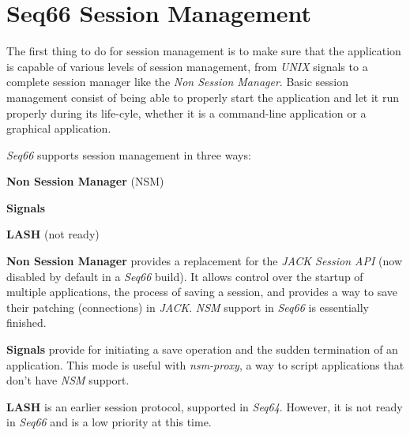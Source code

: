%
%
%

\section{Seq66 Session Management}
\label{sec:sessions}

   The first thing to do for session management is to make sure that the
   application is capable of various levels of session management, from
   \textsl{UNIX} signals to
   a complete session manager like the \textsl{Non Session Manager}.
   Basic session management consist of being able to properly start the
   application and let it run properly during its life-cyle, whether it is a
   command-line application or a graphical application.

   \textsl{Seq66} supports session management in three ways:

   \begin{enumber}
      \item \textbf{Non Session Manager} (NSM)
      \item \textbf{Signals}
      \item \textbf{LASH} (not ready)
   \end{enumber}

   \textbf{Non Session Manager} provides a replacement for the
   \textsl{JACK Session API} (now disabled by default in a \textsl{Seq66}
   build).  It allows control over the startup of multiple applications, the
   process of saving a session, and
   provides a way to save their patching (connections) in \textsl{JACK}.
   \textsl{NSM} support in \textsl{Seq66} is essentially finished.

   \textbf{Signals} provide for initiating a save operation and the sudden
   termination of an application.  This mode is useful with
   \textsl{nsm-proxy}, a way to script applications that don't have \textsl{NSM}
   support.

   \textbf{LASH} is an earlier session protocol, supported in \textsl{Seq64}.
   However, it is not ready in \textsl{Seq66} and is a low priority at this
   time.

